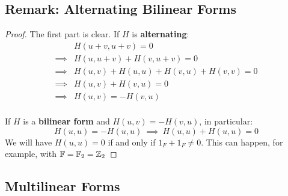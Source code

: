 \documentclass{exam}
\begin{document}
\subsection{Remark: Alternating Bilinear Forms}


\begin{proof}

The first part is clear. If $H$ is \textbf{alternating}:
\begin{align*}
    &H(u+v,u+v) = 0 \\
    \implies &H(u,u+v) + H(v,u+v) = 0 \\
    \implies &H(u,v) + H(u,u) + H(v,u) + H(v,v) = 0 \\
    \implies &H(u,v) + H(v,u) = 0 \\
    \implies &H(u,v) = -H(v,u) \\
\end{align*}

If $H$ is a \textbf{bilinear form} and $H(u,v) = -H(v,u)$, in particular:
\[
H(u,u) = -H(u,u) \ \implies \ H(u,u) + H(u,u) = 0
\]
We will have $H(u,u) = 0$ if and only if $1_F + 1_F \neq 0$. This can happen, for example, with $\mathbb{F} = \mathbb{F}_2 = \mathbb{Z}_2$

\end{proof}

\subsection{Multilinear Forms}
\end{document}
